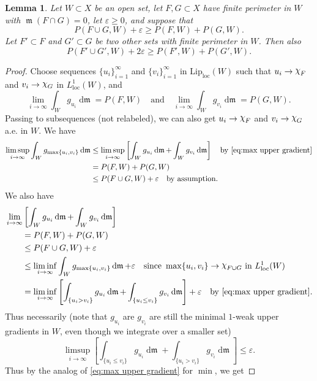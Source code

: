 \documentclass[11pt]{article}
\numberwithin{equation}{section}
\theoremstyle{plain}
\newtheorem{lemma}[equation]{Lemma}
\theoremstyle{definition}
\numberwithin{equation}{section}
\newcommand{\eps}{\varepsilon}
\newcommand{\loc}{\mathrm{loc}}
\newcommand{\liploc}{\mathrm{Lip}_{\mathrm{loc}}}
\newcommand{\ch}{\text{\raise 1.3pt \hbox{$\chi$}\kern-0.2pt}}
\DeclareMathOperator{\frm}{\mathfrak{m}}
\DeclareMathOperator{\dfrm}{d\mathfrak{m}}
\begin{document}
\begin{lemma}\label{lem:open version}
	Let $W\subset X$ be an open set,
	let $F,G\subset X$ have finite perimeter in $W$ with $\frm(F\cap G)=0$,
	let $\eps\ge 0$, and
	suppose that
	\[
	P(F\cup G,W)+\eps\ge P(F,W)+P(G,W).
	\]
	Let $F'\subset F$ and $G'\subset G$ be two other sets with finite perimeter in $W$.
	Then also
	\[
	P(F'\cup G',W)+2\eps \ge P(F',W)+P(G',W).
	\]
\end{lemma}

\begin{proof}
	Choose sequences $\{u_i\}_{i=1}^{\infty}$ and $\{v_i\}_{i=1}^{\infty}$ in $\liploc(W)$
	such that $u_i\to \ch_F$ and $v_i\to \ch_{G}$ in $L^1_{\loc}(W)$, and
	\[
	\lim_{i\to\infty}\int_{W}g_{u_i}\dfrm = P(F,W)
	\quad\textrm{and}\quad 
	\lim_{i\to\infty}\int_{W}g_{v_i}\dfrm = P(G,W).
	\]
	Passing to subsequences (not relabeled), we can also get 
	$u_i\to \ch_F$ and $v_i\to \ch_{G}$ a.e. in $W$.
	We have
	\begin{equation}\label{eq:max is almost optimal}
	\begin{split}
	\limsup_{i\to\infty}\int_{W} g_{\max\{u_i,v_i\}}\dfrm
	&\le \limsup_{i\to\infty}\left[\int_{W} g_{u_i}\dfrm+\int_{W} g_{v_i}\dfrm\right]
	\quad\textrm{by }\eqref{eq:max upper gradient}\\
	&= P(F,W)+P(G,W)\\
	&\le P(F\cup G,W)+\eps\quad\textrm{by assumption}.
	\end{split}
\end{equation}
	We also have
\begin{align*}
&\lim_{i\to\infty}\left[\int_{W} g_{u_i}\dfrm+\int_{W} g_{v_i}\dfrm\right]\\
&\qquad = P(F,W)+P(G,W)\\
&\qquad \le P(F\cup G,W)+\eps\\
&\qquad \le \liminf_{i\to\infty}\int_{W} g_{\max\{u_i,v_i\}}\dfrm+\eps
\quad\textrm{since }\max\{u_i,v_i\}\to \ch_{F\cup G}\textrm{ in }L^1_{\loc}(W)\\
&\qquad = \liminf_{i\to\infty}\left[\int_{\{u_i>v_i\}} g_{u_i}\dfrm+\int_{\{u_i\le v_i\}} g_{v_i}\dfrm\right]+\eps
\quad \textrm{by }\eqref{eq:max upper gradient}.
\end{align*}
Thus necessarily (note that $g_{u_i}$ are $g_{v_i}$ are still the minimal $1$-weak upper gradients
in $W$, even though we integrate over a smaller set)
\[
\limsup_{i\to\infty}\left[\int_{\{u_i\le v_i\}} g_{u_i}\dfrm+
\int_{\{u_i> v_i\}} g_{v_i}\dfrm\right]\le \eps.
\]
Thus by the analog of \eqref{eq:max upper gradient} for $\min$, we get

\end{proof}
\end{document}
